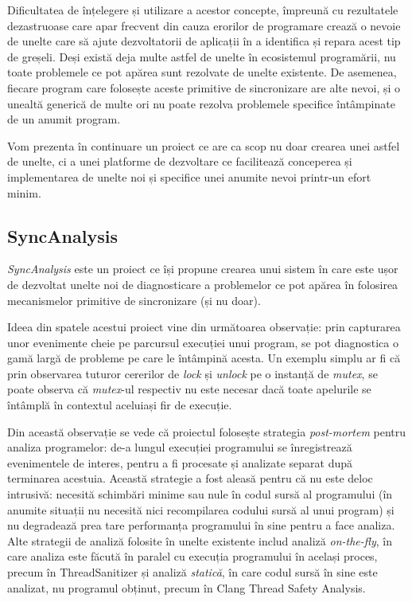 Dificultatea de înțelegere și utilizare a acestor concepte, împreună cu
rezultatele dezastruoase care apar frecvent din cauza erorilor de
programare crează o nevoie de unelte care să ajute dezvoltatorii de
aplicații în a identifica și repara acest tip de greșeli. Deși există
deja multe astfel de unelte în ecosistemul programării, nu toate
problemele ce pot apărea sunt rezolvate de unelte existente. De
asemenea, fiecare program care folosește aceste primitive de
sincronizare are alte nevoi, și o unealtă generică de multe ori nu poate
rezolva problemele specifice întâmpinate de un anumit program.

Vom prezenta în continuare un proiect ce are ca scop nu doar crearea
unei astfel de unelte, ci a unei platforme de dezvoltare ce facilitează
conceperea și implementarea de unelte noi și specifice unei anumite
nevoi printr-un efort minim.

\subsection{SyncAnalysis}
\textit{SyncAnalysis} este un proiect ce își propune crearea unui sistem
în care este ușor de dezvoltat unelte noi de diagnosticare a problemelor
ce pot apărea în folosirea mecanismelor primitive de sincronizare (și nu
doar).

Ideea din spatele acestui proiect vine din următoarea observație:
prin capturarea unor evenimente cheie pe parcursul execuției unui
program, se pot diagnostica o gamă largă de probleme pe care le
întâmpină acesta. Un exemplu simplu ar fi că prin observarea tuturor
cererilor de \textit{lock} și \textit{unlock} pe o instanță de
\textit{mutex}, se poate observa că \textit{mutex}-ul respectiv nu este
necesar dacă toate apelurile se întâmplă în contextul aceluiași fir de
execuție.

Din această observație se vede că proiectul folosește strategia
\textit{post-mortem} pentru analiza programelor: de-a lungul execuției
programului se înregistrează evenimentele de interes, pentru a fi
procesate și analizate separat după terminarea acestuia. Această
strategie a fost aleasă pentru că nu este deloc intrusivă: necesită
schimbări minime sau nule în codul sursă al programului (în anumite
situații nu necesită nici recompilarea codului sursă al unui
program) și nu degradează prea tare performanța programului în sine
pentru a face analiza. Alte strategii de analiză folosite în unelte
existente includ analiză \textit{on-the-fly}, în care analiza este
făcută în paralel cu execuția programului în același proces, precum în
ThreadSanitizer\cite{ThreadSanitizer} și analiză \textit{statică}, în
care codul sursă în sine este analizat, nu programul obținut, precum în
Clang Thread Safety Analysis\cite{ClangThreadSafetyAnalysis}.

